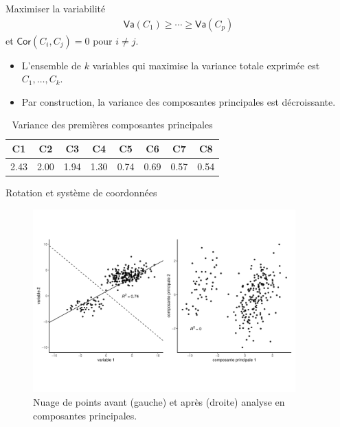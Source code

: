 \documentclass[
  ignorenonframetext,
]{beamer}
\providecommand{\tightlist}{%
  \setlength{\itemsep}{0pt}\setlength{\parskip}{0pt}}\usepackage{longtable,booktabs,array}
\begin{document}
\begin{frame}[fragile]{Maximiser la variabilité}
\protect\hypertarget{maximiser-la-variabilituxe9}{}
\begin{align*}
\mathsf{Va}(C_1) \geq \cdots \geq \mathsf{Va}(C_p)
\end{align*} et \(\mathsf{Cor}(C_i, C_j)=0\) pour \(i \neq j\).

\begin{itemize}
\tightlist
\item
  L'ensemble de \(k\) variables qui maximise la variance totale exprimée
  est \(C_1, \ldots, C_k\).
\item
  Par construction, la variance des composantes principales est
  décroissante.
\end{itemize}

\hypertarget{tbl-eigenvalues}{}
\begin{table}
\caption{\label{tbl-eigenvalues}Variance des premières composantes principales }\tabularnewline

\centering
\begin{tabular}[t]{cccccccc}
\toprule
C1 & C2 & C3 & C4 & C5 & C6 & C7 & C8\\
\midrule
2.43 & 2.00 & 1.94 & 1.30 & 0.74 & 0.69 & 0.57 & 0.54\\
\bottomrule
\end{tabular}
\end{table}
\end{frame}

\begin{frame}{Rotation et système de coordonnées}
\protect\hypertarget{rotation-et-systuxe8me-de-coordonnuxe9es}{}
\begin{figure}

{\centering \includegraphics[width=0.9\textwidth,height=\textheight]{MATH60602-diapos10_files/figure-beamer/fig-acprotation-1.pdf}

}

\caption{\label{fig-acprotation}Nuage de points avant (gauche) et après
(droite) analyse en composantes principales.}

\end{figure}
\end{frame}
\end{document}
